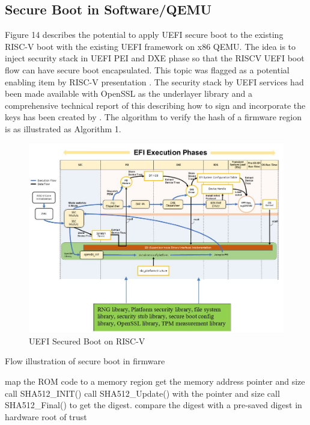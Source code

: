 \documentclass[review]{elsarticle}
\begin{document}
\subsection{ Secure Boot in Software/QEMU}
Figure 14 describes the potential to apply UEFI secure boot to the existing RISC-V boot with the existing UEFI framework on x86 QEMU. The idea is to inject security stack in UEFI PEI and DXE phase so that the RISCV UEFI boot flow can have secure boot encapsulated. This topic was flagged as a potential enabling item by RISC-V presentation \cite{R5:10}. The security stack by UEFI services had been made available with OpenSSL as the underlayer library and a comprehensive technical report of this describing how to sign and incorporate the keys has been created by \cite{R5:11}. The algorithm to verify the hash of a firmware region is as illustrated as Algorithm 1.


\begin{figure}[hbt!]
	\centering
	\includegraphics[width=1\textwidth]{figs/SecureBootOnRISCV.JPG}
	\caption{UEFI Secured Boot on RISC-V}
\end{figure}

\begin{algorithm} [H]
 \caption{Flow illustration of secure boot in firmware}
map the ROM code to a memory region\;
get the memory address pointer and size\;
call SHA512\_INIT()\;
call SHA512\_Update() with the pointer and size\;
call SHA512\_Final() to get the digest.\;
compare the digest with a pre-saved digest in hardware root of trust\;


\end{algorithm}
\end{document}
